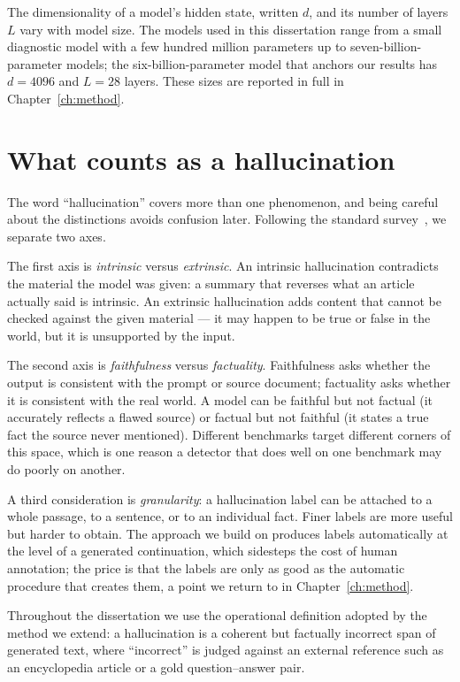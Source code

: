 The dimensionality of a model's hidden state, written $d$, and its number of layers $L$
vary with model size. The models used in this dissertation range from a small diagnostic
model with a few hundred million parameters up to seven-billion-parameter models; the
six-billion-parameter model that anchors our results has $d = 4096$ and $L = 28$ layers.
These sizes are reported in full in Chapter~\ref{ch:method}.

\section{What counts as a hallucination}

The word ``hallucination'' covers more than one phenomenon, and being careful about the
distinctions avoids confusion later. Following the standard
survey~\cite{ji2023survey}, we separate two axes.

The first axis is \emph{intrinsic} versus \emph{extrinsic}. An intrinsic hallucination
contradicts the material the model was given: a summary that reverses what an article
actually said is intrinsic. An extrinsic hallucination adds content that cannot be
checked against the given material --- it may happen to be true or false in the world,
but it is unsupported by the input.

The second axis is \emph{faithfulness} versus \emph{factuality}. Faithfulness asks
whether the output is consistent with the prompt or source document; factuality asks
whether it is consistent with the real world. A model can be faithful but not factual
(it accurately reflects a flawed source) or factual but not faithful (it states a true
fact the source never mentioned). Different benchmarks target different corners of this
space, which is one reason a detector that does well on one benchmark may do poorly on
another.

A third consideration is \emph{granularity}: a hallucination label can be attached to a
whole passage, to a sentence, or to an individual fact. Finer labels are more useful but
harder to obtain. The approach we build on produces labels automatically at the level of
a generated continuation, which sidesteps the cost of human annotation; the price is
that the labels are only as good as the automatic procedure that creates them, a point
we return to in Chapter~\ref{ch:method}.

Throughout the dissertation we use the operational definition adopted by the method we
extend: a hallucination is a coherent but factually incorrect span of generated text,
where ``incorrect'' is judged against an external reference such as an encyclopedia
article or a gold question--answer pair.

